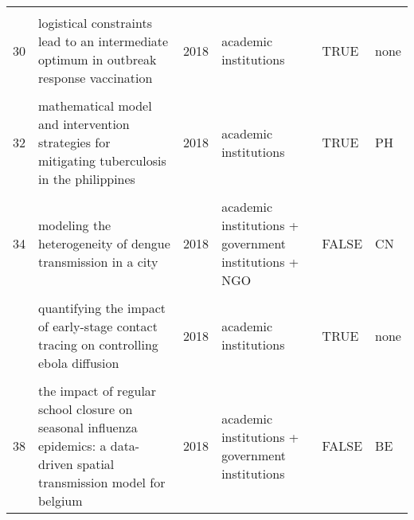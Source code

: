 \documentclass[
]{article}
\begin{document}
\begin{landscape}
\begin{longtable}{l>{\raggedright\arraybackslash}p{4cm}l>{\raggedright\arraybackslash}p{3.5cm}l>{\raggedright\arraybackslash}p{1.5cm}}
\cellcolor{gray!6}{29} & \cellcolor{gray!6}{initial validation of a simulation model for estimating the impact of serogroup a neisseria meningitidis vaccination in the african meningitis belt} & \cellcolor{gray!6}{2018} & \cellcolor{gray!6}{government institutions + NGO} & \cellcolor{gray!6}{FALSE} & \cellcolor{gray!6}{BF}\\
30 & logistical constraints lead to an intermediate optimum in outbreak response vaccination & 2018 & academic institutions & TRUE & none\\
\addlinespace
\cellcolor{gray!6}{31} & \cellcolor{gray!6}{manipulation of contact network structure and the impact on foot-and-mouth disease transmission} & \cellcolor{gray!6}{2018} & \cellcolor{gray!6}{academic institutions + government institutions} & \cellcolor{gray!6}{FALSE} & \cellcolor{gray!6}{GB}\\
32 & mathematical model and intervention strategies for mitigating tuberculosis in the philippines & 2018 & academic institutions & TRUE & PH\\
\cellcolor{gray!6}{33} & \cellcolor{gray!6}{measles outbreak response decision-making under uncertainty: a retrospective analysis} & \cellcolor{gray!6}{2018} & \cellcolor{gray!6}{academic institutions + government institutions} & \cellcolor{gray!6}{FALSE} & \cellcolor{gray!6}{BR}\\
34 & modeling the heterogeneity of dengue transmission in a city & 2018 & academic institutions + government institutions + NGO & FALSE & CN\\
\cellcolor{gray!6}{35} & \cellcolor{gray!6}{modelling the large-scale yellow fever outbreak in luanda, angola, and the impact of vaccination} & \cellcolor{gray!6}{2018} & \cellcolor{gray!6}{academic institutions} & \cellcolor{gray!6}{TRUE} & \cellcolor{gray!6}{AO}\\
\addlinespace
36 & quantifying the impact of early-stage contact tracing on controlling ebola diffusion & 2018 & academic institutions & TRUE & none\\
\cellcolor{gray!6}{37} & \cellcolor{gray!6}{simulation of key interventions for seasonal influenza outbreak control at school in changsha, china} & \cellcolor{gray!6}{2018} & \cellcolor{gray!6}{academic institutions + government institutions} & \cellcolor{gray!6}{FALSE} & \cellcolor{gray!6}{CN}\\
38 & the impact of regular school closure on seasonal influenza epidemics: a data-driven spatial transmission model for belgium & 2018 & academic institutions + government institutions & FALSE & BE\\

\end{longtable}
\end{landscape}
\end{document}
